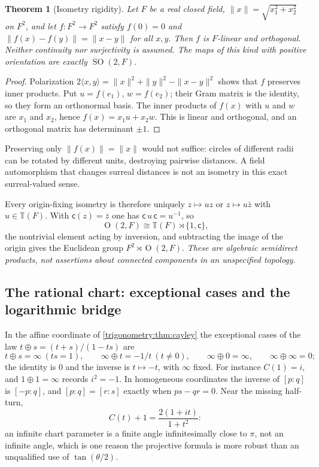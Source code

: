 \documentclass[11pt,letterpaper]{article}
\numberwithin{equation}{section}
\newtheorem{theorem}{Theorem}[section]
\theoremstyle{definition}
\theoremstyle{remark}
\newcommand{\TT}{\mathbb T}
\newcommand{\SO}{\operatorname{SO}}
\newcommand{\Orth}{\operatorname{O}}
\begin{document}
\begin{theorem}[Isometry rigidity]\label{trigonometry:rot:thm:isometry}
Let $F$ be a real closed field, $\|x\|=\sqrt{x_1^2+x_2^2}$ on $F^2$, and let $f:F^2\to F^2$ satisfy
$f(0)=0$ and $\|f(x)-f(y)\|=\|x-y\|$ for all $x,y$. Then $f$ is $F$-linear and orthogonal. Neither
continuity nor surjectivity is assumed. The maps of this kind with positive orientation are exactly
$\SO(2,F)$.
\end{theorem}
\begin{proof}
Polarization $2\langle x,y\rangle=\|x\|^2+\|y\|^2-\|x-y\|^2$ shows that $f$ preserves inner
products. Put $u=f(e_1)$, $w=f(e_2)$; their Gram matrix is the identity, so they form an orthonormal
basis. The inner products of $f(x)$ with $u$ and $w$ are $x_1$ and $x_2$, hence $f(x)=x_1u+x_2w$.
This is linear and orthogonal, and an orthogonal matrix has determinant $\pm1$.
\end{proof}
Preserving only $\|f(x)\|=\|x\|$ would not suffice: circles of different radii can be rotated by
different units, destroying pairwise distances. A field automorphism that changes surreal distances
is not an isometry in this exact surreal-valued sense.

Every origin-fixing isometry is therefore uniquely $z\mapsto uz$ or $z\mapsto u\bar z$ with
$u\in\TT(F)$. With $\mathsf c(z)=\bar z$ one has $\mathsf c\,u\,\mathsf c=u^{-1}$, so
\begin{equation}\label{trigonometry:rot:eq:orthogonal}
 \Orth(2,F)\cong\TT(F)\rtimes\{1,\mathsf c\},
\end{equation}
the nontrivial element acting by inversion, and subtracting the image of the origin gives the
Euclidean group $F^2\rtimes\Orth(2,F)$. \emph{These are algebraic semidirect products, not
assertions about connected components in an unspecified topology.}

\subsection{The rational chart: exceptional cases and the logarithmic bridge}
\label{trigonometry:rot:sec:chart}
In the affine coordinate of \cref{trigonometry:thm:cayley} the exceptional cases of the law
$t\oplus s=(t+s)/(1-ts)$ are
\[
 t\oplus s=\infty\ (ts=1),\qquad \infty\oplus t=-1/t\ (t\ne0),\qquad
 \infty\oplus0=\infty,\qquad \infty\oplus\infty=0;
\]
the identity is $0$ and the inverse is $t\mapsto-t$, with $\infty$ fixed. For instance $C(1)=i$,
and $1\oplus1=\infty$ records $i^2=-1$. In homogeneous coordinates the inverse of $[p:q]$ is
$[-p:q]$, and $[p:q]=[r:s]$ exactly when $ps-qr=0$. Near the missing half-turn,
\begin{equation}\label{trigonometry:rot:eq:halfturn}
 C(t)+1=\frac{2(1+it)}{1+t^2}:
\end{equation}
an infinite chart parameter is a finite angle infinitesimally close to $\pi$, not an infinite
angle, which is one reason the projective formula is more robust than an unqualified use of
$\tan(\theta/2)$.
\end{document}
